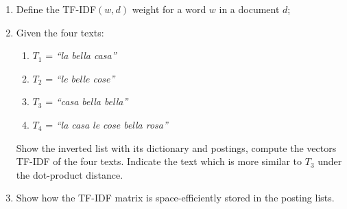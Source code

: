 \exercise

\begin{enumerate}

  \item Define the TF-IDF$(w, d)$ weight for a word $w$ in a document $d$;

  \item Given the four texts:
  \begin{enumerate}
    \item $T_1$ = \emph{``la bella casa''}
    \item $T_2$ = \emph{``le belle cose''}
    \item $T_3$ = \emph{``casa bella bella''}
    \item $T_4$ = \emph{``la casa le cose bella rosa''}
  \end{enumerate}
  Show the inverted list with its dictionary and postings, compute the vectors
  TF-IDF of the four texts. Indicate the text which is more similar to $T_3$
  under the dot-product distance.

  \item Show how the TF-IDF matrix is space-efficiently stored in the posting
  lists.

\end{enumerate}

\solution
\label{10_text_ranking:tfid}

